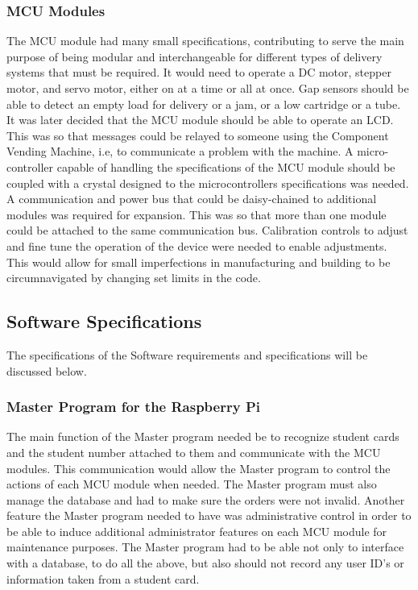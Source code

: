 \documentclass[a4paper,11pt]{article}
\numberwithin{figure}{section}
\numberwithin{table}{section}
\begin{document}
\subsubsection{MCU Modules}
The MCU module had many small specifications, contributing to serve the main purpose of being modular and interchangeable for different types of delivery systems that must be required. It would need to operate a DC motor, stepper motor, and servo motor, either on at a time or all at once. Gap sensors should be able to detect an empty load for delivery or a jam, or a low cartridge or a tube. It was later decided that the MCU module should be able to operate an LCD. This was so that messages could be relayed to someone using the Component Vending Machine, i.e, to communicate a problem with the machine. A micro-controller capable of handling the specifications of the MCU module should be coupled with a crystal designed to the microcontrollers specifications was needed. A communication and power bus that could be daisy-chained to additional modules was required for expansion. This was so that more than one module could be attached to the same communication bus. Calibration controls to adjust and fine tune the operation of the device were needed to enable adjustments. This would allow for small imperfections in manufacturing and building to be circumnavigated by changing set limits in the code.
\subsection{Software Specifications}
The specifications of the Software requirements and specifications will be discussed below.
\subsubsection{Master Program for the Raspberry Pi}
The main function of the Master program needed be to recognize student cards and the student number attached to them and communicate with the MCU modules. This communication would allow the Master program to control the actions of each MCU module when needed. The Master program must also manage the database and had to make sure the orders were not invalid. Another feature the Master program needed to have was administrative control in order to be able to induce additional administrator features on each MCU module for maintenance purposes. The Master program had to be able not only to interface with a database, to do all the above, but also should not record any user ID's or information taken from a student card.
\end{document}
